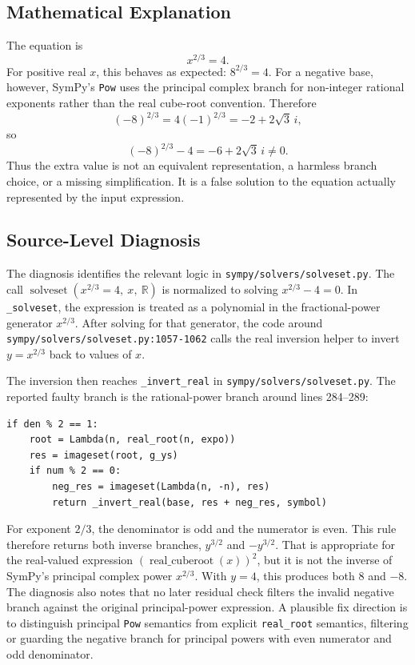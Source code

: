 \documentclass[11pt]{article}
\begin{document}
\subsection{Mathematical Explanation}

The equation is
\[
    x^{2/3}=4.
\]
For positive real \(x\), this behaves as expected: \(8^{2/3}=4\). For a negative base, however, SymPy's \texttt{Pow} uses the principal complex branch for non-integer rational exponents rather than the real cube-root convention. Therefore
\[
    (-8)^{2/3}
      = 4(-1)^{2/3}
      = -2 + 2\sqrt{3}\,i,
\]
so
\[
    (-8)^{2/3}-4 = -6 + 2\sqrt{3}\,i \ne 0.
\]
Thus the extra value is not an equivalent representation, a harmless branch choice, or a missing simplification. It is a false solution to the equation actually represented by the input expression.

\subsection{Source-Level Diagnosis}

The diagnosis identifies the relevant logic in \nolinkurl{sympy/solvers/solveset.py}. The call
\(\operatorname{solveset}(x^{2/3}=4,\ x,\ \mathbb{R})\) is normalized to solving
\(x^{2/3}-4=0\). In \texttt{\_solveset}, the expression is treated as a polynomial in the fractional-power generator \(x^{2/3}\). After solving for that generator, the code around \nolinkurl{sympy/solvers/solveset.py:1057-1062} calls the real inversion helper to invert \(y=x^{2/3}\) back to values of \(x\).

The inversion then reaches \texttt{\_invert\_real} in \nolinkurl{sympy/solvers/solveset.py}. The reported faulty branch is the rational-power branch around lines 284--289:

\begin{lstlisting}[style=bugpython]
if den % 2 == 1:
    root = Lambda(n, real_root(n, expo))
    res = imageset(root, g_ys)
    if num % 2 == 0:
        neg_res = imageset(Lambda(n, -n), res)
        return _invert_real(base, res + neg_res, symbol)
\end{lstlisting}

For exponent \(2/3\), the denominator is odd and the numerator is even. This rule therefore returns both inverse branches, \(y^{3/2}\) and \(-y^{3/2}\). That is appropriate for the real-valued expression \((\operatorname{real\_cuberoot}(x))^2\), but it is not the inverse of SymPy's principal complex power \(x^{2/3}\). With \(y=4\), this produces both \(8\) and \(-8\). The diagnosis also notes that no later residual check filters the invalid negative branch against the original principal-power expression. A plausible fix direction is to distinguish principal \texttt{Pow} semantics from explicit \texttt{real\_root} semantics, filtering or guarding the negative branch for principal powers with even numerator and odd denominator.
\end{document}
